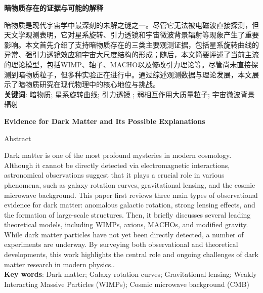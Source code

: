 

\fontsize{12pt}{18pt}\selectfont \setcounter{page}{1}
\begin{center} 
	{\fontsize{15.75pt}{13pt}\selectfont\bf 暗物质存在的证据与可能的解释}
\end{center}
\begin{center}
{\fontsize{15.75pt}{13pt}\selectfont{\bf 摘~要}} \vspace{1.0cm}
\end{center}
暗物质是现代宇宙学中最深刻的未解之谜之一。尽管它无法被电磁波直接探测，但天文学观测表明，它对星系旋转、引力透镜和宇宙微波背景辐射等现象产生了重要影响。本文首先介绍了支持暗物质存在的三类主要观测证据，包括星系旋转曲线的异常、强引力透镜效应和宇宙大尺度结构的形成；随后，本文简要评述了当前主流的理论模型，包括WIMP、轴子、MACHO以及修改引力理论等。尽管尚未直接探测到暗物质粒子，但多种实验正在进行中。通过综述观测数据与理论发展，本文展示了暗物质研究在现代物理中的核心地位与挑战。\\
\textbf{\hei 关键词}: 暗物质;  星系旋转曲线; 引力透镜 ;  弱相互作用大质量粒子; 宇宙微波背景辐射

\newpage
\fontsize{12pt}{18pt}\selectfont 
\begin{center} {\fontsize{15.75pt}{13pt}\selectfont\bf
Evidence for Dark Matter and Its Possible Explanations}\end{center}
\begin{center}
{\large Abstract} \vspace{1.0cm}
\end{center}
Dark matter is one of the most profound mysteries in modern cosmology. Although it cannot be directly detected via electromagnetic interactions, astronomical observations suggest that it plays a crucial role in various phenomena, such as galaxy rotation curves, gravitational lensing, and the cosmic microwave background. This paper first reviews three main types of observational evidence for dark matter: anomalous galactic rotation, strong lensing effects, and the formation of large-scale structures. Then, it briefly discusses several leading theoretical models, including WIMPs, axions, MACHOs, and modified gravity. While dark matter particles have not yet been directly detected, a number of experiments are underway. By surveying both observational and theoretical developments, this work highlights the central role and ongoing challenges of dark matter research in modern physics..\\
\textbf{Key words}: Dark matter; Galaxy rotation curves; Gravitational lensing; Weakly Interacting Massive Particles (WIMPs); Cosmic microwave background (CMB)

\newpage
